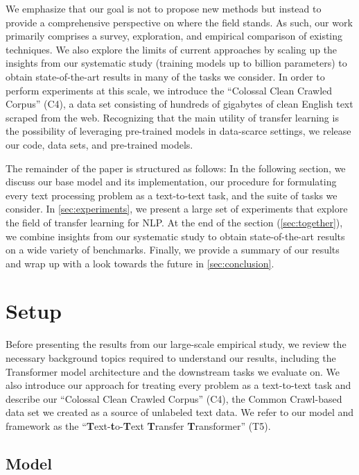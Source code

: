 \documentclass[twoside,11pt]{article}
\makeatletter
\newcommand\footnoteref[1]{\protected@xdef\@thefnmark{\ref{#1}}\@footnotemark}
\makeatother
\begin{document}
We emphasize that our goal is not to propose new methods but instead to provide a comprehensive perspective on where the field stands.
As such, our work primarily comprises a survey, exploration, and empirical comparison of existing techniques.
We also explore the limits of current approaches by scaling up the insights from our systematic study (training models up to  billion parameters) to obtain state-of-the-art results in many of the tasks we consider.
In order to perform experiments at this scale, we introduce the ``Colossal Clean Crawled Corpus'' (C4), a data set consisting of hundreds of gigabytes of clean English text scraped from the web.
Recognizing that the main utility of transfer learning is the possibility of leveraging pre-trained models in data-scarce settings, we release our code, data sets, and pre-trained models.\footnoteref{fn:oss}

The remainder of the paper is structured as follows:
In the following section, we discuss our base model and its implementation, our procedure for formulating every text processing problem as a text-to-text task, and the suite of tasks we consider.
In \cref{sec:experiments}, we present a large set of experiments that explore the field of transfer learning for NLP.
At the end of the section (\cref{sec:together}), we combine insights from our systematic study to obtain state-of-the-art results on a wide variety of benchmarks.
Finally, we provide a summary of our results and wrap up with a look towards the future in \cref{sec:conclusion}.

\section{Setup}
\label{sec:setup}

Before presenting the results from our large-scale empirical study, we review the necessary background topics required to understand our results, including the Transformer model architecture and the downstream tasks we evaluate on.
We also introduce our approach for treating every problem as a text-to-text task and describe our ``Colossal Clean Crawled Corpus'' (C4), the Common Crawl-based data set we created as a source of unlabeled text data.
We refer to our model and framework as the ``\textbf{T}ext-\textbf{t}o-\textbf{T}ext \textbf{T}ransfer \textbf{T}ransformer'' (T5).

\subsection{Model}
\label{sec:model}
\end{document}
